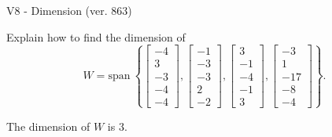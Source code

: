 \begin{exercise}
  \begin{exerciseTitle}V8 - Dimension (ver. 863)\end{exerciseTitle}
  \begin{exerciseStatement}
    Explain how to find the dimension of 
\[W=\mathrm{span}\ \left\{\left[\begin{array}{r}
-4 \\
3 \\
-3 \\
-4 \\
-4
\end{array}\right] , \left[\begin{array}{r}
-1 \\
-3 \\
-3 \\
2 \\
-2
\end{array}\right] , \left[\begin{array}{r}
3 \\
-1 \\
-4 \\
-1 \\
3
\end{array}\right] , \left[\begin{array}{r}
-3 \\
1 \\
-17 \\
-8 \\
-4
\end{array}\right]\right\}.\]



  \end{exerciseStatement}
  \begin{exerciseAnswer}
   The dimension of \(W\) is  \(3\).
  


  \end{exerciseAnswer}
\end{exercise}